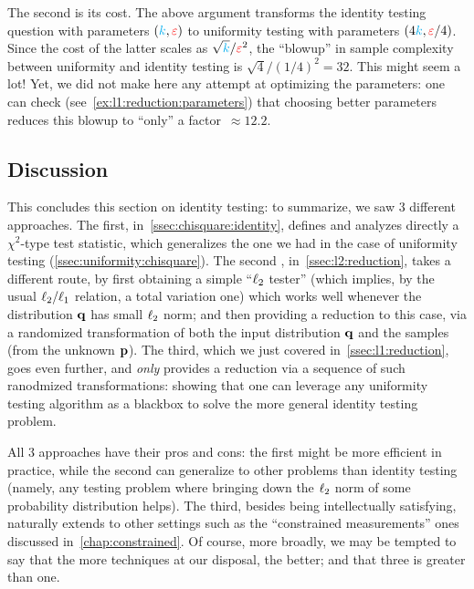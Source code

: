 The second is its cost. The above argument transforms the identity testing question with parameters $(\ab,\dst)$ to uniformity testing with parameters $(4\ab, \dst/4)$. Since the cost of the latter scales as $\sqrt{\ab}/\dst^2$, the ``blowup'' in sample complexity between uniformity and identity testing is $\sqrt{4}/(1/4)^2 = 32$. This might seem a lot! Yet, we did not make here any attempt at optimizing the parameters: one can check (see~\cref{ex:l1:reduction:parameters}) that choosing better parameters reduces this blowup to ``only'' a factor~$\approx 12.2$.

\subsection{Discussion}
This concludes this section on identity testing: to summarize, we saw 3 different approaches. The first, in~\cref{ssec:chisquare:identity}, defines and analyzes directly a $\chi^2$-type test statistic, which generalizes the one we had in the case of uniformity testing (\cref{ssec:uniformity:chisquare}). The second , in~\cref{ssec:l2:reduction}, takes a different route, by first obtaining a simple ``$\lp[2]$ tester'' (which implies, by the usual $\lp[2]/\lp[1]$ relation, a total variation one) which works well whenever the distribution $\q$ has small $\lp[2]$ norm; and then providing a reduction to this case, via a randomized transformation of both the input distribution $\q$ and the samples (from the unknown $\p$). The third, which we just covered in~\cref{ssec:l1:reduction}, goes even further, and \emph{only} provides a reduction via a sequence of such ranodmized transformations: showing that one can leverage any uniformity testing algorithm as a blackbox to solve the more general identity testing problem.

All 3 approaches have their pros and cons: the first might be more efficient in practice, while the second can generalize to other problems than identity testing (namely, any testing problem where bringing down the $\lp[2]$ norm of some probability distribution helps). The third, besides being intellectually satisfying, naturally extends to other settings such as the ``constrained measurements'' ones discussed in~\cref{chap:constrained}. Of course, more broadly, we may be tempted to say that the more techniques at our disposal, the better; and that three is greater than one.

